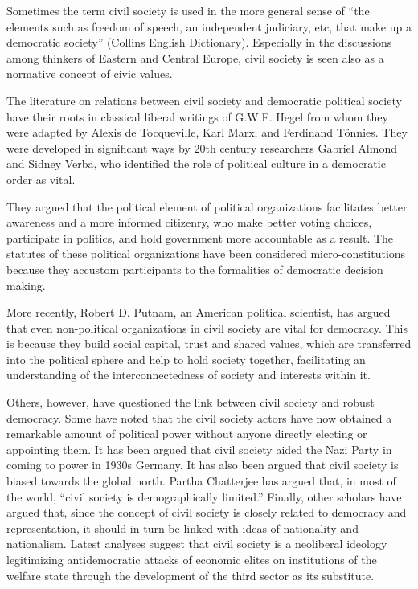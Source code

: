\documentclass[
]{book}
\begin{document}
Sometimes the term civil society is used in the more general sense of ``the elements such as freedom of speech, an independent judiciary, etc, that make up a democratic society'' (Collins English Dictionary). Especially in the discussions among thinkers of Eastern and Central Europe, civil society is seen also as a normative concept of civic values.

The literature on relations between civil society and democratic political society have their roots in classical liberal writings of G.W.F. Hegel from whom they were adapted by Alexis de Tocqueville, Karl Marx, and Ferdinand Tönnies. They were developed in significant ways by 20th century researchers Gabriel Almond and Sidney Verba, who identified the role of political culture in a democratic order as vital.

They argued that the political element of political organizations facilitates better awareness and a more informed citizenry, who make better voting choices, participate in politics, and hold government more accountable as a result. The statutes of these political organizations have been considered micro-constitutions because they accustom participants to the formalities of democratic decision making.

More recently, Robert D. Putnam, an American political scientist, has argued that even non-political organizations in civil society are vital for democracy. This is because they build social capital, trust and shared values, which are transferred into the political sphere and help to hold society together, facilitating an understanding of the interconnectedness of society and interests within it.

Others, however, have questioned the link between civil society and robust democracy. Some have noted that the civil society actors have now obtained a remarkable amount of political power without anyone directly electing or appointing them. It has been argued that civil society aided the Nazi Party in coming to power in 1930s Germany. It has also been argued that civil society is biased towards the global north. Partha Chatterjee has argued that, in most of the world, ``civil society is demographically limited.'' Finally, other scholars have argued that, since the concept of civil society is closely related to democracy and representation, it should in turn be linked with ideas of nationality and nationalism. Latest analyses suggest that civil society is a neoliberal ideology legitimizing antidemocratic attacks of economic elites on institutions of the welfare state through the development of the third sector as its substitute.
\end{document}
